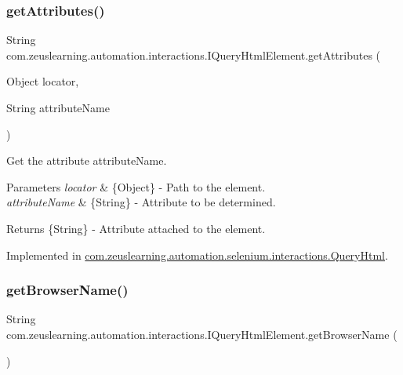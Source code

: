\subsubsection{\texorpdfstring{get\+Attributes()}{getAttributes()}}
{\footnotesize\ttfamily String com.\+zeuslearning.\+automation.\+interactions.\+I\+Query\+Html\+Element.\+get\+Attributes (\begin{DoxyParamCaption}\item[{Object}]{locator,  }\item[{String}]{attribute\+Name }\end{DoxyParamCaption})}

Get the attribute {\ttfamily attribute\+Name}.


\begin{DoxyParams}{Parameters}
{\em locator} & \{Object\} -\/ Path to the element. \\
\hline
{\em attribute\+Name} & \{String\} -\/ Attribute to be determined.\\
\hline
\end{DoxyParams}
\begin{DoxyReturn}{Returns}
\{String\} -\/ Attribute attached to the element. 
\end{DoxyReturn}


Implemented in \hyperlink{classcom_1_1zeuslearning_1_1automation_1_1selenium_1_1interactions_1_1QueryHtml_adfec4c777e003455fdc2a512d4a00959}{com.\+zeuslearning.\+automation.\+selenium.\+interactions.\+Query\+Html}.

\hypertarget{interfacecom_1_1zeuslearning_1_1automation_1_1interactions_1_1IQueryHtmlElement_a4ec7d7e9291f5dfe81fdbb93217af747}{}\label{interfacecom_1_1zeuslearning_1_1automation_1_1interactions_1_1IQueryHtmlElement_a4ec7d7e9291f5dfe81fdbb93217af747} 
\subsubsection{\texorpdfstring{get\+Browser\+Name()}{getBrowserName()}}
{\footnotesize\ttfamily String com.\+zeuslearning.\+automation.\+interactions.\+I\+Query\+Html\+Element.\+get\+Browser\+Name (\begin{DoxyParamCaption}{ }\end{DoxyParamCaption})}

